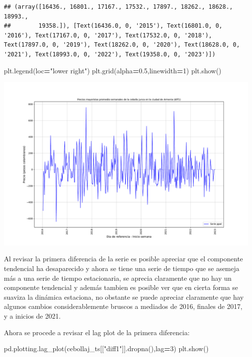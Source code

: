 \documentclass[
]{book}
\newenvironment{Shaded}{\begin{snugshade}}{\end{snugshade}}
\newcommand{\DecValTok}[1]{\textcolor[rgb]{0.00,0.00,0.81}{#1}}
\newcommand{\FloatTok}[1]{\textcolor[rgb]{0.00,0.00,0.81}{#1}}
\newcommand{\NormalTok}[1]{#1}
\newcommand{\OperatorTok}[1]{\textcolor[rgb]{0.81,0.36,0.00}{\textbf{#1}}}
\newcommand{\StringTok}[1]{\textcolor[rgb]{0.31,0.60,0.02}{#1}}
\begin{document}
\begin{verbatim}
## (array([16436., 16801., 17167., 17532., 17897., 18262., 18628., 18993.,
##        19358.]), [Text(16436.0, 0, '2015'), Text(16801.0, 0, '2016'), Text(17167.0, 0, '2017'), Text(17532.0, 0, '2018'), Text(17897.0, 0, '2019'), Text(18262.0, 0, '2020'), Text(18628.0, 0, '2021'), Text(18993.0, 0, '2022'), Text(19358.0, 0, '2023')])
\end{verbatim}

\begin{Shaded}
\begin{Highlighting}[]
\NormalTok{plt.legend(loc}\OperatorTok{=}\StringTok{"lower right"}\NormalTok{)}
\NormalTok{plt.grid(alpha}\OperatorTok{=}\FloatTok{0.5}\NormalTok{,linewidth}\OperatorTok{=}\DecValTok{1}\NormalTok{)}
\NormalTok{plt.show()}
\end{Highlighting}
\end{Shaded}

\includegraphics{bookdown-demo_files/figure-latex/unnamed-chunk-60-23.pdf}

Al revisar la primera diferencia de la serie es posible apreciar que el componente tendencial ha desaparecido y ahora se tiene una serie de tiempo que se asemeja más a una serie de tiempo estacionaria, se aprecia claramente que no hay un componente tendencial y además tambien es posible ver que en cierta forma se suaviza la dinámica estaciona, no obstante se puede apreciar claramente que hay algunos cambios considerablemente bruscos a mediados de 2016, finales de 2017, y a inicios de 2021.

Ahora se procede a revisar el lag plot de la primera diferencia:

\begin{Shaded}
\begin{Highlighting}[]

\NormalTok{pd.plotting.lag\_plot(cebollaj\_ts[[}\StringTok{"diff1"}\NormalTok{]].dropna(),lag}\OperatorTok{=}\DecValTok{3}\NormalTok{)}
\NormalTok{plt.show()}
\end{Highlighting}
\end{Shaded}
\end{document}
